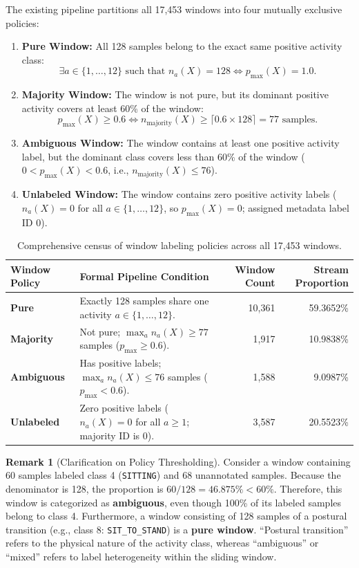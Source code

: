 \documentclass[11pt,a4paper]{article}
\newcommand{\code}[1]{{\small\ttfamily\nolinkurl{#1}}}
\theoremstyle{definition}
\newtheorem{remark}[proposition]{Remark}
\begin{document}
The existing pipeline partitions all 17,453 windows into four mutually exclusive policies:
\begin{enumerate}
\item \textbf{Pure Window:} All 128 samples belong to the exact same positive activity class:
\begin{equation}
\exists a \in \{1, \ldots, 12\} \text{ such that } n_a(X) = 128 \iff p_{\max}(X) = 1.0.
\end{equation}
\item \textbf{Majority Window:} The window is not pure, but its dominant positive activity covers at least 60\% of the window:
\begin{equation}
p_{\max}(X) \ge 0.6 \iff n_{\text{majority}}(X) \ge \lceil 0.6 \times 128 \rceil = 77\text{ samples}.
\end{equation}
\item \textbf{Ambiguous Window:} The window contains at least one positive activity label, but the dominant class covers less than 60\% of the window ($0 < p_{\max}(X) < 0.6$, i.e., $n_{\text{majority}}(X) \le 76$).
\item \textbf{Unlabeled Window:} The window contains zero positive activity labels ($n_a(X) = 0$ for all $a \in \{1, \ldots, 12\}$, so $p_{\max}(X) = 0$; assigned metadata label ID 0).
\end{enumerate}

\begin{table}[htbp]\centering\small
\begin{tabularx}{\linewidth}{@{}P{2.4cm}Yrr@{}}\toprule
Window Policy & Formal Pipeline Condition & Window Count & Stream Proportion\\\midrule
\textbf{Pure} & Exactly 128 samples share one activity $a \in \{1,\ldots,12\}$. & 10,361 & 59.3652\%\\
\textbf{Majority} & Not pure; $\max_a n_a(X) \ge 77$ samples ($p_{\max} \ge 0.6$). & 1,917 & 10.9838\%\\
\textbf{Ambiguous} & Has positive labels; $\max_a n_a(X) \le 76$ samples ($p_{\max} < 0.6$). & 1,588 & 9.0987\%\\
\textbf{Unlabeled} & Zero positive labels ($n_a(X) = 0$ for all $a \ge 1$; majority ID is 0). & 3,587 & 20.5523\%\\\bottomrule
\end{tabularx}
\caption{Comprehensive census of window labeling policies across all 17,453 windows.}
\end{table}

\begin{remark}[Clarification on Policy Thresholding]
Consider a window containing 60 samples labeled class 4 (\code{SITTING}) and 68 unannotated samples. Because the denominator is 128, the proportion is $60/128 = 46.875\% < 60\%$. Therefore, this window is categorized as \textbf{ambiguous}, even though 100\% of its labeled samples belong to class 4. Furthermore, a window consisting of 128 samples of a postural transition (e.g., class 8: \code{SIT_TO_STAND}) is a \textbf{pure window}. ``Postural transition'' refers to the physical nature of the activity class, whereas ``ambiguous'' or ``mixed'' refers to label heterogeneity within the sliding window.
\end{remark}
\end{document}
